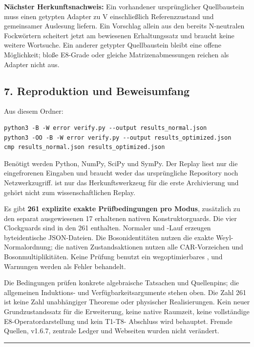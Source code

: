 \textbf{Nächster Herkunftsnachweis:} Ein vorhandener ursprünglicher
Quellbaustein muss einen getypten Adapter zu V einschließlich
Referenzzustand und gemeinsamer Auslesung liefern. Ein Vorschlag allein
aus den bereits N-neutralen Fockwörtern scheitert jetzt am bewiesenen
Erhaltungssatz und braucht keine weitere Wortsuche. Ein anderer getypter
Quellbaustein bleibt eine offene Möglichkeit; bloße E8-Grade oder
gleiche Matrizenabmessungen reichen als Adapter nicht aus.

\subsection{7. Reproduktion und
Beweisumfang}\label{reproduktion-und-beweisumfang}

Aus diesem Ordner:

\begin{verbatim}
python3 -B -W error verify.py --output results_normal.json
python3 -OO -B -W error verify.py --output results_optimized.json
cmp results_normal.json results_optimized.json
\end{verbatim}

Benötigt werden Python, NumPy, SciPy und SymPy. Der Replay liest nur die
eingefrorenen Eingaben und braucht weder das ursprüngliche Repository
noch Netzwerkzugriff.  ist nur das Herkunftswerkzeug
für die erste Archivierung und gehört nicht zum wissenschaftlichen
Replay.

Es gibt \textbf{261 explizite exakte Prüfbedingungen pro Modus},
zusätzlich zu den separat ausgewiesenen 17 erhaltenen nativen
Konstruktorguards. Die vier Clockguards sind in den 261 enthalten.
Normaler und -Lauf erzeugen byteidentische JSON-Dateien.
Die Bosonidentitäten nutzen die exakte Weyl- Normalordnung; die nativen
Zustandsaktionen nutzen alle CAR-Vorzeichen und Bosonmultiplikitäten.
Keine Prüfung benutzt ein wegoptimierbares , und
Warnungen werden als Fehler behandelt.

Die Bedingungen prüfen konkrete algebraische Tatsachen und Quellenpins;
die allgemeinen Induktions- und Verfügbarkeitsargumente stehen oben. Die
Zahl 261 ist keine Zahl unabhängiger Theoreme oder physischer
Realisierungen. Kein neuer Grundzustandssatz für die Erweiterung, keine
native Raumzeit, keine vollständige E8-Operatordarstellung und kein
T1-T8- Abschluss wird behauptet. Fremde Quellen, v1.6.7, zentrale Ledger
und Webseiten wurden nicht verändert.

\begin{center}\rule{0.5\linewidth}{0.5pt}\end{center}

